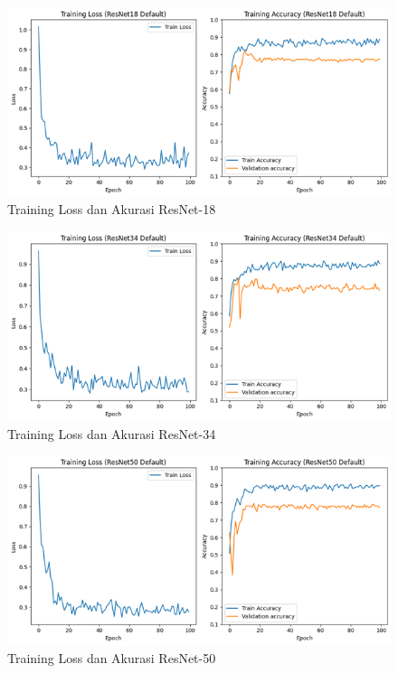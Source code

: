 \begin{figure}[hbtp]
	\centering
	\includegraphics[scale=0.8]{gambar/TrainingGraphResNet18.png}
	\caption{Training Loss dan Akurasi ResNet-18}
	\label{Img:GraphResNet18}
\end{figure}

\begin{figure}[hbtp]
	\centering
	\includegraphics[scale=0.85]{gambar/TrainingGraphResNet34.png}
	\caption{Training Loss dan Akurasi ResNet-34}
	\label{Img:GraphResNet34}
\end{figure}

\begin{figure}[hbtp]
	\centering
	\includegraphics[scale=0.8]{gambar/TrainingGraphResNet50.png}
	\caption{Training Loss dan Akurasi ResNet-50}
	\label{Img:GraphResNet50}
\end{figure}

